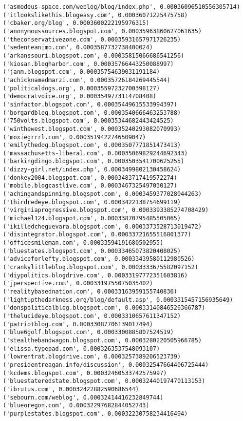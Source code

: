 \documentclass[11pt]{article}
\begin{document}
\begin{Verbatim}[commandchars=\\\{\}]
('asmodeus-space.com/weblog/blog/index.php', 0.00036096510556305714)
('itlookslikethis.blogeasy.com', 0.00036071225475758)
('cbaker.org/blog', 0.0003600222195976315)
('anonymoussources.blogspot.com', 0.00035963860627061635)
('theconservativezone.com', 0.00035931657971726235)
('sedenteanimo.com', 0.0003587732738400024)
('arkanssouri.blogspot.com', 0.00035815066686541256)
('kiosan.blogharbor.com', 0.00035766443250088997)
('janm.blogspot.com', 0.00035754639031191184)
('achicknamedmarzi.com', 0.00035726184269445544)
('politicaldogs.org', 0.00035597232700398127)
('democratvoice.org', 0.0003549773114708408)
('sinfactor.blogspot.com', 0.00035449615533994397)
('borgardblog.blogspot.com', 0.0003540666463253788)
('750volts.blogspot.com', 0.00035344682443424525)
('winthewest.blogspot.com', 0.00035240293082070993)
('moxiegrrrl.com', 0.0003519422746509047)
('emilythedog.blogspot.com', 0.0003507771851473413)
('massachusetts-liberal.com', 0.00035069829244692343)
('barkingdingo.blogspot.com', 0.0003503541700625255)
('dizzy-girl.net/index.php', 0.0003499802130458624)
('donkey2004.blogspot.com', 0.0003483717419572274)
('mobile.blogcastlive.com', 0.0003467325497030127)
('achingandspinning.blogspot.com', 0.0003459377028044263)
('thirdredeye.blogspot.com', 0.0003422138754699119)
('virginiaprogressive.blogspot.com', 0.0003393385274708429)
('michael124.blogspot.com', 0.00033870795485505065)
('ikilledcheguevara.blogspot.com', 0.0003373528713019472)
('disintegrator.blogspot.com', 0.00033721655516801377)
('officesmileman.com', 0.00033594191680502955)
('bluestates.blogspot.com', 0.00033465073820408025)
('adviceforlefty.blogspot.com', 0.00033439580112980526)
('crankylittleblog.blogspot.com', 0.0003333675582097152)
('diypolitics.blogdrive.com', 0.00033197772351603816)
('jperspective.com', 0.0003319755075035402)
('realitybasednation.com', 0.00033163959155740836)
('lightupthedarkness.org/blog/default.asp', 0.0003315457156935649)
('donspoliticalblog.blogspot.com', 0.00033140846526366787)
('thelucideye.blogspot.com', 0.0003310657611347152)
('patriotblog.com', 0.00033087706139017494)
('blue6golf.blogspot.com', 0.0003300885807524519)
('stealthebandwagon.blogspot.com', 0.0003280220505966785)
('elissa.typepad.com', 0.0003263537548093107)
('lowrentrat.blogdrive.com', 0.0003257389206523739)
('presidentreagan.info/discussion', 0.00032547664406725444)
('kcdems.blogspot.com', 0.00032460533742575997)
('bluestateredstate.blogspot.com', 0.00032440197470113153)
('ibrutus.com', 0.00032422882590686544)
('sebourn.com/weblog', 0.00032414416232849744)
('blueoregon.com', 0.00032297682844052743)
('purplestates.blogspot.com', 0.00032230758234416494)

\end{Verbatim}
\end{document}
